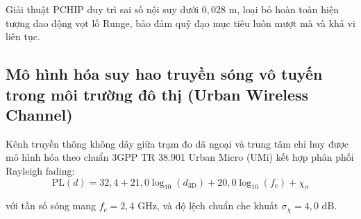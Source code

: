 \begin{table}[H]
\centering
\caption{Kết quả mô phỏng sai số nội suy động học giữa các phương pháp đồng bộ hóa đa tốc độ lấy mẫu}
\label{tab:multirate-interpolation-methods-comparison}
\end{table}

Giải thuật PCHIP duy trì sai số nội suy dưới $0{,}028$ m, loại bỏ hoàn toàn hiện tượng dao động vọt lố Runge, bảo đảm quỹ đạo mục tiêu luôn mượt mà và khả vi liên tục.

\subsection{Mô hình hóa suy hao truyền sóng vô tuyến trong môi trường đô thị (Urban Wireless Channel)}

\hspace{0.5cm} Kênh truyền thông không dây giữa trạm đo dã ngoại và trung tâm chỉ huy được mô hình hóa theo chuẩn 3GPP TR 38.901 Urban Micro (UMi) kết hợp phân phối Rayleigh fading:
\begin{equation}
\text{PL}(d) = 32{,}4 + 21{,}0 \log_{10}(d_{\text{3D}}) + 20{,}0 \log_{10}(f_c) + \chi_\sigma
\label{eq:3gpp-path-loss-urban-micro}
\end{equation}

với tần số sóng mang $f_c = 2{,}4$ GHz, và độ lệch chuẩn che khuất $\sigma_{\chi} = 4{,}0$ dB.

